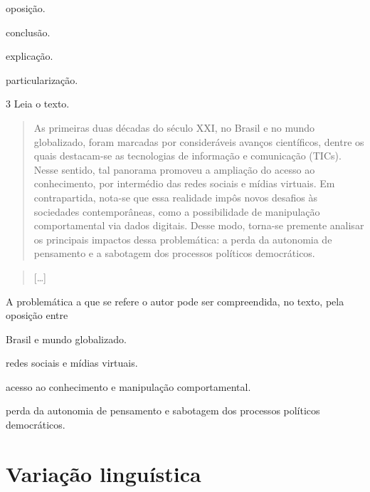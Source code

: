 \begin{escolha}
\item oposição.

\item conclusão.

\item explicação.

\item particularização.
\end{escolha}

\num{3} Leia o texto.

\begin{quote}
As primeiras duas décadas do século XXI, no Brasil e no mundo
globalizado, foram marcadas por consideráveis avanços científicos,
dentre os quais destacam-se as tecnologias de informação e comunicação
(TICs). Nesse sentido, tal panorama promoveu a ampliação do acesso ao
conhecimento, por intermédio das redes sociais e mídias virtuais. Em
contrapartida, nota-se que essa realidade impôs novos desafios às
sociedades contemporâneas, como a possibilidade de manipulação
comportamental via dados digitais. Desse modo, torna-se premente
analisar os principais impactos dessa problemática: a perda da autonomia
de pensamento e a sabotagem dos processos políticos democráticos.
\end{quote}

\begin{quote}
{[}\ldots{]}
\end{quote}


A problemática a que se refere o autor pode ser compreendida, no texto,
pela oposição entre

\begin{escolha}
\item Brasil e mundo globalizado.

\item redes sociais e mídias virtuais.

\item acesso ao conhecimento e manipulação comportamental.

\item perda da autonomia de pensamento e sabotagem dos processos políticos
democráticos.
\end{escolha}

\chapter{Variação linguística}

